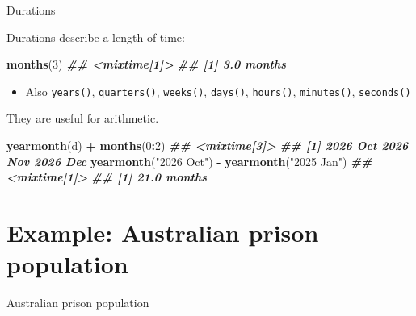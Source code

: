 \documentclass[
  14pt,
  ignorenonframetext,
  aspectratio=169,
]{beamer}
\newenvironment{Shaded}{\begin{snugshade}}{\end{snugshade}}
\newcommand{\DecValTok}[1]{\textcolor[rgb]{0.00,0.00,0.81}{#1}}
\newcommand{\DocumentationTok}[1]{\textcolor[rgb]{0.56,0.35,0.01}{\textbf{\textit{#1}}}}
\newcommand{\FunctionTok}[1]{\textcolor[rgb]{0.13,0.29,0.53}{\textbf{#1}}}
\newcommand{\NormalTok}[1]{#1}
\newcommand{\SpecialCharTok}[1]{\textcolor[rgb]{0.81,0.36,0.00}{\textbf{#1}}}
\newcommand{\StringTok}[1]{\textcolor[rgb]{0.31,0.60,0.02}{#1}}
\providecommand{\tightlist}{%
  \setlength{\itemsep}{0pt}\setlength{\parskip}{0pt}}
\renewenvironment{Shaded}{\vspace*{0.15cm}\color{black}\fontsize{10}{10}\sf\begin{snugshade}\color{black}}{\end{snugshade}}
\begin{document}
\begin{frame}[fragile]{Durations}
\protect{}\label{durations}
\fontsize{11}{12}\sf

\alert{Durations} describe a length of time:

\begin{Shaded}
\begin{Highlighting}[]
\FunctionTok{months}\NormalTok{(}\DecValTok{3}\NormalTok{)}
\DocumentationTok{\#\# \textless{}mixtime[1]\textgreater{}}
\DocumentationTok{\#\# [1] 3.0 months}
\end{Highlighting}
\end{Shaded}

\begin{itemize}
\tightlist
\item
  Also \texttt{years()}, \texttt{quarters()}, \texttt{weeks()},
  \texttt{days()}, \texttt{hours()}, \texttt{minutes()},
  \texttt{seconds()}
\end{itemize}

\pause

They are useful for arithmetic.

\begin{Shaded}
\begin{Highlighting}[]
\FunctionTok{yearmonth}\NormalTok{(d) }\SpecialCharTok{+} \FunctionTok{months}\NormalTok{(}\DecValTok{0}\SpecialCharTok{:}\DecValTok{2}\NormalTok{)}
\DocumentationTok{\#\# \textless{}mixtime[3]\textgreater{}}
\DocumentationTok{\#\# [1] 2026 Oct 2026 Nov 2026 Dec}
\FunctionTok{yearmonth}\NormalTok{(}\StringTok{"2026 Oct"}\NormalTok{) }\SpecialCharTok{{-}} \FunctionTok{yearmonth}\NormalTok{(}\StringTok{"2025 Jan"}\NormalTok{)}
\DocumentationTok{\#\# \textless{}mixtime[1]\textgreater{}}
\DocumentationTok{\#\# [1] 21.0 months}
\end{Highlighting}
\end{Shaded}

\pause
\end{frame}

\section{Example: Australian prison
population}\label{example-australian-prison-population}

\begin{frame}{Australian prison population}
\protect{}\label{australian-prison-population}
\end{frame}
\end{document}
